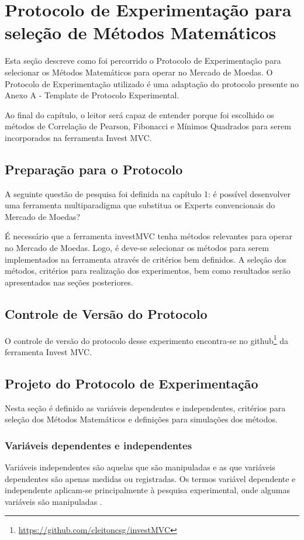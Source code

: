 \chapter{Protocolo de Experimentação para seleção de Métodos Matemáticos}

Esta seção descreve como foi percorrido o Protocolo de Experimentação para selecionar os Métodos Matemáticos para operar no Mercado de Moedas. O Protocolo de Experimentação utilizado é uma adaptação do protocolo presente no Anexo A - Template de Protocolo
Experimental.

Ao final do capítulo, o leitor será capaz de entender porque foi escolhido os métodos de Correlação de Pearson, Fibonacci e Mínimos Quadrados para serem incorporados na ferramenta Invest MVC.

\section{Preparação para o Protocolo}

A seguinte questão de pesquisa foi definida na capítulo 1: é possível desenvolver uma ferramenta multiparadigma que substitua os Experts convencionais do Mercado de Moedas? 

É necessário que a ferramenta investMVC tenha métodos relevantes para operar no Mercado de Moedas. Logo, é deve-se selecionar os métodos para serem implementados na ferramenta através de critérios bem definidos. A seleção dos métodos, critérios para realização dos experimentos, bem como resultados serão apresentados nas seções posteriores.

\section{Controle de Versão do Protocolo}

O controle de versão do protocolo desse experimento encontra-se no github\footnote{\url{https://github.com/cleitoncsg/investMVC}} da ferramenta Invest MVC.

\section{Projeto do Protocolo de Experimentação}

Nesta seção é definido as variáveis dependentes e independentes, critérios para seleção dos Métodos Matemáticos e definições para simulações dos métodos.


\subsection{Variáveis dependentes e independentes}
Variáveis independentes são aquelas que são manipuladas e as que variáveis dependentes são apenas medidas ou registradas. Os termos variável dependente e independente aplicam-se principalmente à pesquisa experimental, onde algumas variáveis são manipuladas \cite[pág.~13]{hoppen2010}.

